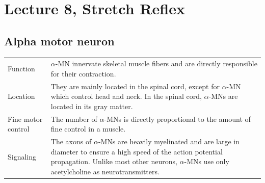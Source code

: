 \section{Lecture 8, Stretch Reflex}
\subsection{Alpha motor neuron}
\begin{tabular}{p{4cm}p{15cm}}
Function	& $\alpha$-MN innervate skeletal muscle fibers and are directly responsible for their contraction.\\
Location	& They are mainly located in the spinal cord, except for $\alpha$-MN which control head and neck. In the spinal cord, $\alpha$-MNs are located in its gray matter.\\
Fine motor control	& The number of $\alpha$-MNs is directly proportional to the amount of fine control in a muscle.\\
Signaling	& The axons of $\alpha$-MNs are heavily myelinated and are large in diameter to ensure a high speed of the action potential propagation. Unlike most other neurons, $\alpha$-MNs use only acetylcholine as neurotransmitters.
\end{tabular}
